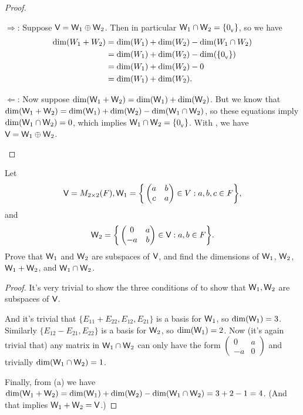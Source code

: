 \begin{proof}
\begin{enumerate}
\(\Longrightarrow\):
Suppose \(\textsf{V} = \textsf{W}_1 \oplus \textsf{W}_2\).
Then in particular \(\textsf{W}_1 \cap \textsf{W}_2 = \{ 0_{_{\textsf{V}}} \}\), so we have
\begin{align*}
    \dim(W_1 + W_2) & = \dim(W_1) + \dim(W_2) - \dim(W_1 \cap W_2) \\
                    & = \dim(W_1) + \dim(W_2) - \dim(\{ 0_{_{\textsf{V}}} \}) \\
                    & = \dim(W_1) + \dim(W_2) - 0 \\
                    & = \dim(W_1) + \dim(W_2).
\end{align*}

\(\Longleftarrow\):
Now suppose \(\dim(\textsf{W}_1 + \textsf{W}_2) = \dim(\textsf{W}_1) + \dim(\textsf{W}_2)\).
But we know that \(\dim(\textsf{W}_1 + \textsf{W}_2) = \dim(\textsf{W}_1) + \dim(\textsf{W}_2) - \dim(\textsf{W}_1 \cap \textsf{W}_2)\), so these equations imply \(\dim(\textsf{W}_1 \cap \textsf{W}_2) = 0\), which implies \(\textsf{W}_1 \cap \textsf{W}_2 = \{ 0_{_{\textsf{V}}} \}\).
With , we have \(\textsf{V} = \textsf{W}_1 \oplus \textsf{W}_2\).
\end{enumerate}
\end{proof}

\begin{exercise} \label{exercise 1.6.30}
Let
\[
    \textsf{V} = M_{2 \times 2}(F),
    \textsf{W}_1 = \bigg\{
        \begin{pmatrix}
            a & b \\
            c & a
        \end{pmatrix}
        \in V: a, b, c \in F
        \bigg\},
\]
and
\[
    \textsf{W}_2 = \bigg\{
        \begin{pmatrix}
            0 & a \\
            -a & b
        \end{pmatrix}
        \in \textsf{V}: a, b \in F
        \bigg\}.
\]
Prove that \(\textsf{W}_1\) and \(\textsf{W}_2\) are subspaces of \(\textsf{V}\), and find the dimensions of \(\textsf{W}_1\), \(\textsf{W}_2\), \(\textsf{W}_1 + \textsf{W}_2\), and \(\textsf{W}_1 \cap \textsf{W}_2\).
\end{exercise}

\begin{proof}
It's very trivial to show the three conditions of  to show that \(\textsf{W}_1, \textsf{W}_2\) are subspaces of \(\textsf{V}\).

And it's trivial that \(\{ E_{11} + E_{22}, E_{12}, E_{21} \}\) is a basis for \(\textsf{W}_1\), so \(\dim(\textsf{W}_1) = 3\).
Similarly \(\{ E_{12} - E_{21}, E_{22} \}\) is a basis for \(\textsf{W}_2\), so \(\dim(\textsf{W}_1) = 2\).
Now (it's again trivial that) any matrix in \(\textsf{W}_1 \cap \textsf{W}_2\) can only have the form
\(\begin{pmatrix}
    0 & a \\
    -a & 0
\end{pmatrix}\)
and trivially \(\dim(\textsf{W}_1 \cap \textsf{W}_2) = 1\).

Finally, from (a) we have \(\dim(\textsf{W}_1 + \textsf{W}_2) = \dim(\textsf{W}_1) + \dim(\textsf{W}_2) - \dim(\textsf{W}_1 \cap \textsf{W}_2) = 3 + 2 - 1 = 4\).
(And that implies \(\textsf{W}_1 + \textsf{W}_2 = \textsf{V}\).)
\end{proof}

